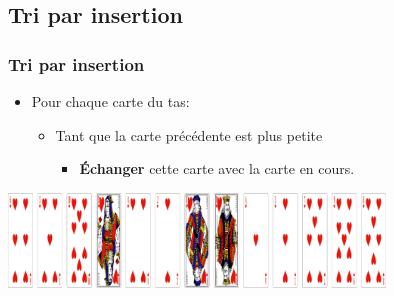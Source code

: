 \documentclass[svgnames,11pt]{beamer}
\begin{document}
\subsection{Tri par insertion}
\begin{frame}
    \frametitle{Tri par insertion}

    \begin{itemize}
        \item Pour chaque carte du tas:
              \begin{itemize}
                  \item Tant que la carte précédente est plus petite
                  \begin{itemize}
                    \item \textbf{Échanger} cette carte avec la carte en cours.
                  \end{itemize}
              \end{itemize}

    \end{itemize}

\end{frame}
\begin{frame}

    \begin{center}
        \centering
        \includegraphics[width=10cm]{ressources/jeu-coeur-melange.png}
    \end{center}
    \begin{center}
    \end{center}

\end{frame}
\end{document}
